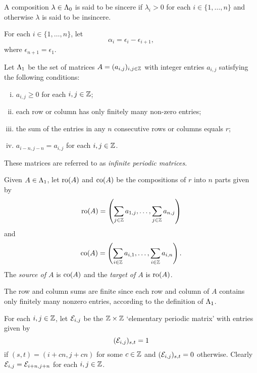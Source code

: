 \documentclass[a4paper, 11pt]{report}
\begin{document}
A composition $\lambda\in\Lambda_0{}$ is said to be sincere if $\lambda_i>0$ for each $i\in\{1,\ldots,n\}$ and otherwise $\lambda$ is said to be insincere.

For each $i\in\{1,\ldots,n\}$, let
\begin{equation*}
\alpha_i = \epsilon_i - \epsilon_{i+1},
\end{equation*}
where $\epsilon_{n+1}=\epsilon_1$.

\begin{definition}\label{def:matrices}
Let $\Lambda_1{}$ be the set of matrices $A=(a_{i,j})_{i,j\in\mathbb{Z}}$ with integer entries $a_{i,j}$ satisfying the following conditions: 
\begin{enumerate}[i.]
\item
$a_{i,j}\geq 0$ for each $i,j\in\mathbb{Z}$;
\item
each row or column has only finitely many non-zero entries;
\item
the sum of the entries in any $n$ consecutive rows or columns equals $r$;
\item
$a_{i-n,j-n}=a_{i,j}$ for each $i,j\in\mathbb{Z}$.
\end{enumerate}
These matrices are referred to as \emph{infinite periodic matrices}.
\end{definition}

\begin{definition}\label{def:source-target}
Given $A\in\Lambda_1{}$, let $\operatorname{ro}(A)$ and $\operatorname{co}(A)$ be the compositions of $r$ into $n$ parts given by
\begin{equation*}
\operatorname{ro}(A) = \left( \sum_{j\in\mathbb{Z}}a_{1,j}, \ldots, \sum_{j\in\mathbb{Z}} a_{n,j}\right)
\end{equation*}
and
\begin{equation*}
\operatorname{co}(A) = \left( \sum_{i\in\mathbb{Z}} a_{i,1}, \ldots, \sum_{i\in\mathbb{Z}} a_{i,n}\right).
\end{equation*}
The \emph{source of $A$} is $\operatorname{co}(A)$ and the \emph{target of $A$} is $\operatorname{ro}(A)$.
\end{definition}

The row and column sums are finite since each row and column of $A$ contains only finitely many nonzero entries, according to the definition of $\Lambda_1{}$.

	For each $i,j\in\mathbb{Z}$, let $\mathcal{E}_{i,j}$ be the $\mathbb{Z}\times\mathbb{Z}$ `elementary periodic matrix' with entries given by
\begin{equation*}
(\mathcal{E}_{i,j})_{s,t}=1
\end{equation*}
if $(s,t) = (i+cn,j+cn)$ for some $c\in\mathbb{Z}$ and $(\mathcal{E}_{i,j})_{s,t}=0$ otherwise. Clearly $\mathcal{E}_{i,j} = \mathcal{E}_{i+n,j+n}$ for each $i,j\in\mathbb{Z}$.
\end{document}
